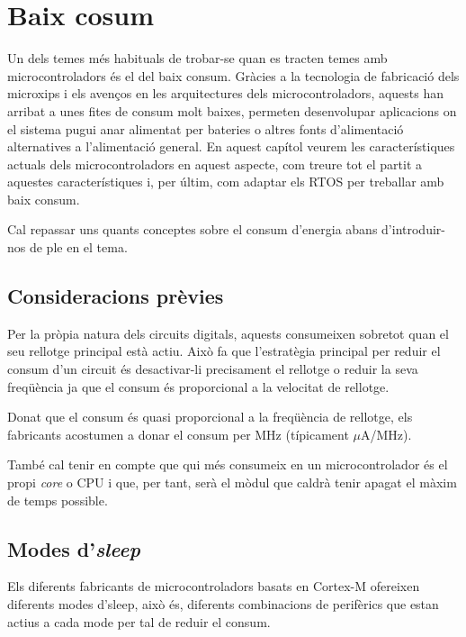 \chapter{Baix cosum}
\label{ch:low-power}
Un dels temes més habituals de trobar-se quan es tracten temes amb microcontroladors és el del baix consum. Gràcies a la tecnologia de fabricació dels microxips i els avenços en les arquitectures dels microcontroladors, aquests han arribat a unes fites de consum molt baixes, permeten desenvolupar aplicacions on el sistema pugui anar alimentat per bateries o altres fonts d'alimentació alternatives a l'alimentació general. En aquest capítol veurem les característiques actuals dels microcontroladors en aquest aspecte, com treure tot el partit a aquestes característiques i, per últim, com adaptar els \gls{RTOS} per treballar amb baix consum.

Cal repassar uns quants conceptes sobre el consum d'energia abans d'introduir-nos de ple en el tema.

\section{Consideracions prèvies}
\label{sec:lowpowerintro}

Per la pròpia natura dels circuits digitals, aquests consumeixen sobretot quan el seu rellotge principal està actiu. Això fa que l'estratègia principal per reduir el consum d'un circuit és desactivar-li precisament el rellotge o reduir la seva freqüència ja que el consum és proporcional a la velocitat de rellotge.
\begin{remark}
 Donat que el consum és quasi proporcional a la freqüència de rellotge, els fabricants acostumen a donar el consum per MHz (típicament $\mu$A/MHz).
\end{remark}

També cal tenir en compte que qui més consumeix en un microcontrolador és el propi {\em core} o CPU i que, per tant, serà el mòdul que caldrà tenir apagat el màxim de temps possible.

\section{Modes d'{\em sleep}}
\label{sec:sleepmodes}
Els diferents fabricants de microcontroladors basats en Cortex-M ofereixen diferents modes d'sleep, això és, diferents combinacions de perifèrics que estan actius a cada mode per tal de reduir el consum.

